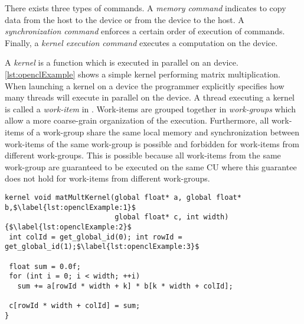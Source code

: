 There exists three types of commands.
A \emph{memory command} indicates to copy data from the host to the device or from the device to the host.
A \emph{synchronization command} enforces a certain order of execution of commands.
Finally, a \emph{kernel execution command} executes a computation on the device.

A \OpenCL \emph{kernel} is a function which is executed in parallel on an \OpenCL device.
\autoref{lst:openclExample} shows a simple \OpenCL kernel performing matrix multiplication.
When launching a kernel on a device the programmer explicitly specifies how many threads will execute in parallel on the device.
A thread executing a kernel is called a \emph{work-item} in \OpenCL.
Work-items are grouped together in \emph{work-groups} which allow a more coarse-grain organization of the execution.
Furthermore, all work-items of a work-group share the same local memory and synchronization between work-items of the same work-group is possible and forbidden for work-items from different work-groups.
This is possible because all work-items from the same work-group are guaranteed to be executed on the same CU where this guarantee does not hold for work-items from different work-groups.

\begin{lstlisting}[float, caption={Example of an \OpenCL kernel.}, label={lst:openclExample}]
kernel void matMultKernel(global float* a, global float* b,$\label{lst:openclExample:1}$
                          global float* c, int width) {$\label{lst:openclExample:2}$
 int colId = get_global_id(0); int rowId = get_global_id(1);$\label{lst:openclExample:3}$

 float sum = 0.0f;
 for (int i = 0; i < width; ++i)
   sum += a[rowId * width + k] * b[k * width + colId];

 c[rowId * width + colId] = sum;
}
\end{lstlisting}

